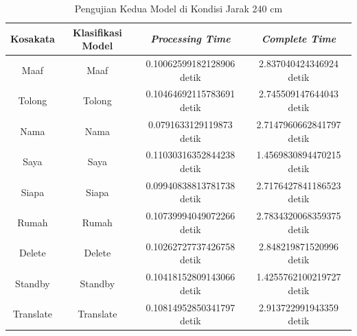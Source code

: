 \begin{longtable}{|c|c|c|c|}
  \caption{Pengujian Kedua Model di Kondisi Jarak 240 cm}
  \label{tb:prediksitengah2}                                   \\
  \hline
  \rowcolor[HTML]{C0C0C0}
  \textbf{Kosakata} & \textbf{Klasifikasi Model} & \textbf{\emph{Processing Time}} & \textbf{\emph{Complete Time}}\\
  \hline
  Maaf              & Maaf                        & 0.10062599182128906 detik                          & 2.837040424346924 detik                                 \\
  Tolong            & Tolong                      & 0.10464692115783691 detik                          & 2.745509147644043 detik                                 \\
  Nama              & Nama                        & 0.0791633129119873 detik                           & 2.7147960662841797 detik                                  \\
  Saya              & Saya                        & 0.11030316352844238 detik                          & 1.4569830894470215 detik                                  \\
  Siapa             & Siapa                       & 0.09940838813781738 detik                          & 2.7176427841186523 detik                                  \\
  Rumah             & Rumah                       & 0.10739994049072266 detik                          & 2.7834320068359375 detik                                  \\
  Delete            & Delete                      & 0.10262727737426758 detik                          & 2.848219871520996 detik                                 \\
  Standby           & Standby                     & 0.10418152809143066 detik                          & 1.4255762100219727 detik                                  \\
  Translate         & Translate                   & 0.10814952850341797 detik                          & 2.913722991943359  detik                                 \\
  \hline
\end{longtable}

